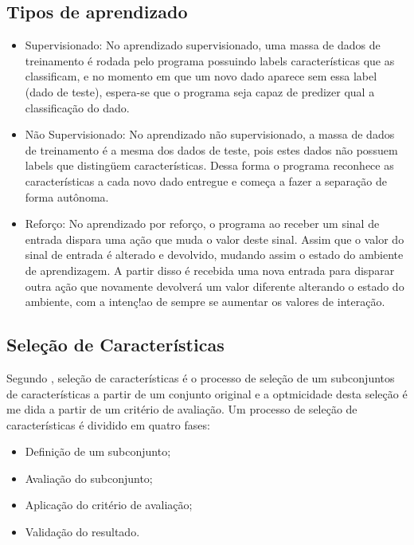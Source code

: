 \subsection{Tipos de aprendizado}
    \begin{itemize}
        \item Supervisionado: No aprendizado supervisionado, uma massa de dados de treinamento é rodada pelo programa possuindo labels características que as classificam, e no momento em que um novo dado aparece sem essa label (dado de teste), espera-se que o programa seja capaz de predizer qual a classificação do dado.
        \item Não Supervisionado: No aprendizado não supervisionado, a massa de dados de treinamento é a mesma dos dados de teste, pois estes dados não possuem labels que distingüem características. Dessa forma o programa reconhece as características a cada novo dado entregue e começa a fazer a separação de forma autônoma. \cite{chao2011}
        \item Reforço: No aprendizado por reforço, o programa ao receber um sinal de entrada dispara uma ação que muda o valor deste sinal. Assim que o valor do sinal de entrada é alterado e devolvido, mudando assim o estado do ambiente de aprendizagem. A partir disso é recebida uma nova entrada para disparar outra ação que novamente devolverá um valor diferente alterando o estado do ambiente, com a intenç!ao de sempre se aumentar os valores de interação. \cite{kaelbling1996}
    \end{itemize}

\subsection{Seleção de Características}
    Segundo \cite{Yu2005}, seleção de características é o processo de seleção de um subconjuntos de características a partir de um conjunto original e a optmicidade desta seleção é me dida a partir de um critério de avaliação. Um processo de seleção de características é dividido em quatro fases:

    \begin{itemize}
        \item Definição de um subconjunto;
        \item Avaliação do subconjunto;
        \item Aplicação do critério de avaliação;
        \item Validação do resultado.
    \end{itemize}

